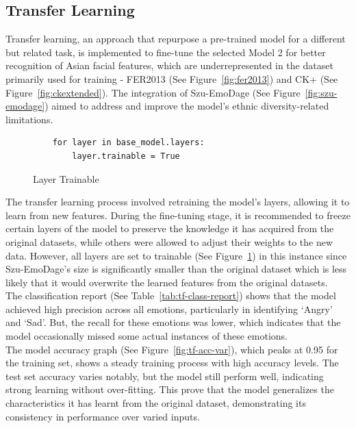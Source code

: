 \subsection{Transfer Learning}
Transfer learning, an approach that repurpose a pre-trained model for a different but related task, is implemented to fine-tune the selected Model 2 for better recognition of Asian facial features, which are underrepresented in the dataset primarily used for training - FER2013 (See Figure~\ref{fig:fer2013}) and CK+ (See Figure~\ref{fig:ckextended}).
The integration of Szu-EmoDage (See Figure~\ref{fig:szu-emodage}) aimed to address and improve the model's ethnic diversity-related limitations.
\begin{figure}[H]
    \begin{verbatim}
    for layer in base_model.layers:
        layer.trainable = True 
    \end{verbatim}
    \caption{Layer Trainable}
    \label{fig:layer-trainable}
\end{figure}
\indent The transfer learning process involved retraining the model's layers, allowing it to learn from new features.
During the fine-tuning stage, it is recommended to freeze certain layers of the model to preserve the knowledge it has acquired from the original datasets, while others were allowed to adjust their weights to the new data.
However, all layers are set to trainable (See Figure~\ref{fig:layer-trainable}) in this instance since Szu-EmoDage's size is significantly smaller than the original dataset which is less likely that it would overwrite the learned features from the original datasets.
\\
\indent The classification report (See Table~\ref{tab:tf-class-report}) shows that the model achieved high precision across all emotions, particularly in identifying `Angry' and `Sad'.
But, the recall for these emotions was lower, which indicates that the model occasionally missed some actual instances of these emotions.
\\
\indent The model accuracy graph (See Figure~\ref{fig:tf-acc-var}), which peaks at 0.95 for the training set, shows a steady training process with high accuracy levels.
The test set accuracy varies notably, but the model still perform well, indicating strong learning without over-fitting.
This prove that the model generalizes the characteristics it has learnt from the original dataset, demonstrating its consistency in performance over varied inputs.
